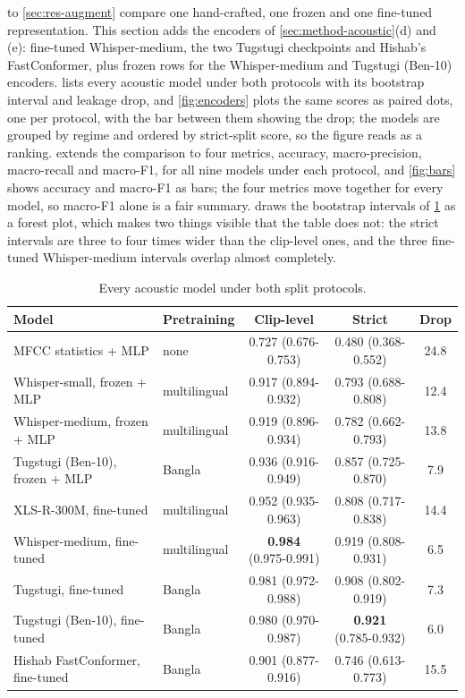  to \cref{sec:res-augment} compare one hand-crafted, one
frozen and one fine-tuned representation. This section adds the encoders of
\cref{sec:method-acoustic}(d) and (e): fine-tuned Whisper-medium, the two
Tugstugi checkpoints and Hishab's FastConformer, plus frozen rows for the
Whisper-medium and Tugstugi (Ben-10) encoders.  lists every
acoustic model under both protocols with its bootstrap interval and leakage
drop, and \cref{fig:encoders} plots the same scores as paired dots, one per
protocol, with the bar between them showing the drop; the models are grouped by
regime and ordered by strict-split score, so the figure reads as a ranking.
 extends the comparison to four metrics, accuracy,
macro-precision, macro-recall and macro-F1, for all nine models under each
protocol, and \cref{fig:bars} shows accuracy and macro-F1 as bars; the four
metrics move together for every model, so macro-F1 alone is a fair summary.
 draws the bootstrap intervals of \cref{tab:encoders} as a
forest plot, which makes two things visible that the table does not: the strict
intervals are three to four times wider than the clip-level ones, and the three
fine-tuned Whisper-medium intervals overlap almost completely.

\begin{table}[ht]
  \centering
  \caption{Every acoustic model under both split protocols.}
  \label{tab:encoders}
  \footnotesize
  \setlength{\tabcolsep}{4pt}
  \begin{tabular}{llccc}
    \toprule
    Model & Pretraining & Clip-level & Strict & Drop \\
    \midrule
    MFCC statistics + MLP            & none         & 0.727 (0.676-0.753) & 0.480 (0.368-0.552) & 24.8 \\
    \addlinespace
    Whisper-small, frozen + MLP      & multilingual & 0.917 (0.894-0.932) & 0.793 (0.688-0.808) & 12.4 \\
    Whisper-medium, frozen + MLP     & multilingual & 0.919 (0.896-0.934) & 0.782 (0.662-0.793) & 13.8 \\
    Tugstugi (Ben-10), frozen + MLP  & Bangla       & 0.936 (0.916-0.949) & 0.857 (0.725-0.870) & 7.9 \\
    \addlinespace
    XLS-R-300M, fine-tuned           & multilingual & 0.952 (0.935-0.963) & 0.808 (0.717-0.838) & 14.4 \\
    Whisper-medium, fine-tuned       & multilingual & \textbf{0.984} (0.975-0.991) & 0.919 (0.808-0.931) & 6.5 \\
    Tugstugi, fine-tuned             & Bangla       & 0.981 (0.972-0.988) & 0.908 (0.802-0.919) & 7.3 \\
    Tugstugi (Ben-10), fine-tuned    & Bangla       & 0.980 (0.970-0.987) & \textbf{0.921} (0.785-0.932) & 6.0 \\
    Hishab FastConformer, fine-tuned & Bangla       & 0.901 (0.877-0.916) & 0.746 (0.613-0.773) & 15.5 \\
    \bottomrule
  \end{tabular}
\end{table}

